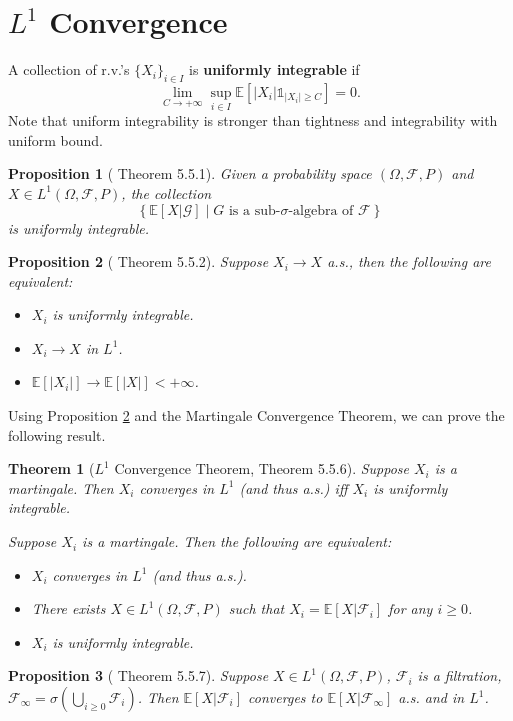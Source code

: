 \documentclass[openany]{book}
\newtheorem{proposition}{Proposition}[chapter]
\newtheorem{theorem}{Theorem}[chapter]
\theoremstyle{definition}
\theoremstyle{remark}
\begin{document}
\section{$L^1$ Convergence}
A collection of r.v.'s $\{X_i\}_{i\in I}$ is \textbf{uniformly integrable} if
\begin{equation*}
    \lim_{C\to+\infty}\sup_{i\in I}\mathbb{E}\left[|X_i|\mathds{1}_{|X_i|\ge C}\right]=0.
\end{equation*}
Note that uniform integrability is stronger than tightness and integrability with uniform bound.
\begin{proposition}[\cite{D10} Theorem 5.5.1]
    Given a probability space $(\Omega,\mathcal{F},P)$ and $X\in L^1(\Omega,\mathcal{F},P)$, the collection
    \begin{equation*}
        \left\{\mathbb{E}[X|\mathcal{G}]\middle|G\textrm{ is a sub-}\sigma\textrm{-algebra of }\mathcal{F}\right\}
    \end{equation*}
    is uniformly integrable.
\end{proposition}
\begin{proposition}[\cite{D10} Theorem 5.5.2]\label{prop:L1Converge}
    Suppose $X_i\to X$ a.s., then the following are equivalent:
    \begin{itemize}
        \item $X_i$ is uniformly integrable.
        \item $X_i\to X$ in $L^1$.
        \item $\mathbb{E}\left[|X_i|\right]\to \mathbb{E}\left[|X|\right]<+\infty$.
    \end{itemize}
\end{proposition}
Using Proposition \ref{prop:L1Converge} and the Martingale Convergence Theorem, we can prove the following result.
\begin{theorem}[$L^1$ Convergence Theorem, \cite{D10} Theorem 5.5.6]
    Suppose $X_i$ is a martingale. Then $X_i$ converges in $L^1$ (and thus a.s.) iff $X_i$ is uniformly integrable.

    Suppose $X_i$ is a martingale. Then the following are equivalent:
    \begin{itemize}
        \item $X_i$ converges in $L^1$ (and thus a.s.).
        \item There exists $X\in L^1(\Omega,\mathcal{F},P)$ such that $X_i=\mathbb{E}[X|\mathcal{F}_i]$ for any $i\ge0$.
        \item $X_i$ is uniformly integrable.
    \end{itemize}
\end{theorem}
\begin{proposition}[\cite{D10} Theorem 5.5.7]
    Suppose $X\in L^1(\Omega,\mathcal{F},P)$, $\mathcal{F}_i$ is a filtration, $\mathcal{F}_{\infty}=\sigma\left(\bigcup_{i\ge0}\mathcal{F}_i\right)$. Then $\mathbb{E}[X|\mathcal{F}_i]$ converges to $\mathbb{E}[X|\mathcal{F}_{\infty}]$ a.s. and in $L^1$.
\end{proposition}
\end{document}
